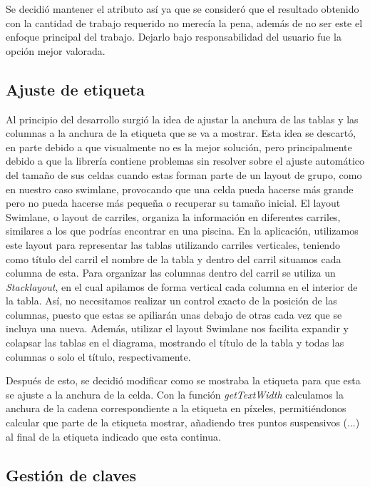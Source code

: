 Se decidió mantener el atributo así ya que se consideró que el resultado obtenido con la cantidad de trabajo requerido no merecía la pena, además de no ser este el enfoque principal del trabajo. Dejarlo bajo responsabilidad del usuario fue la opción mejor valorada.

\subsection{Ajuste de etiqueta}

Al principio del desarrollo surgió la idea de ajustar la anchura de las tablas y las columnas a la anchura de la etiqueta que se va a mostrar. Esta idea se descartó, en parte debido a que visualmente no es la mejor solución, pero principalmente debido a que la librería contiene problemas sin resolver sobre el ajuste automático del tamaño de sus celdas cuando estas forman parte de un layout de grupo, como en nuestro caso swimlane, provocando que una celda pueda hacerse más grande pero no pueda hacerse más pequeña o recuperar su tamaño inicial. El layout Swimlane, o layout de carriles, organiza la información en diferentes carriles, similares a los que podrías encontrar en una piscina. En la aplicación, utilizamos este layout para representar las tablas utilizando carriles verticales, teniendo como título del carril el nombre de la tabla y dentro del carril situamos cada columna de esta. Para organizar las columnas dentro del carril se utiliza un \textit{Stacklayout}, en el cual apilamos de forma vertical cada columna en el interior de la tabla. Así, no necesitamos realizar un control exacto de la posición de las columnas, puesto que estas se apiliarán unas debajo de otras cada vez que se incluya una nueva. Además, utilizar el layout Swimlane nos facilita expandir y colapsar las tablas en el diagrama, mostrando el título de la tabla y todas las columnas o solo el título, respectivamente.

Después de esto, se decidió modificar como se mostraba la etiqueta para que esta se ajuste a la anchura de la celda. Con la función \textit{getTextWidth} calculamos la anchura de la cadena correspondiente a la etiqueta en píxeles, permitiéndonos calcular que parte de la etiqueta mostrar, añadiendo tres puntos suspensivos (...) al final de la etiqueta indicado que esta continua.

\subsection{Gestión de claves}

